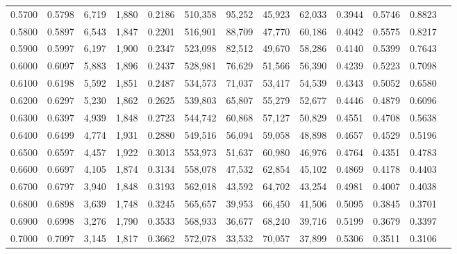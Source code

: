 \begin{tabular}{rrrrrrrrrrrrr}
0.5700 & 0.5798 &  6,719 & 1,880 &                                     0.2186 & 510,358 &  95,252 &  45,923 &  62,033 & 0.3944 & 0.5746 & 0.8823 \\
0.5800 & 0.5897 &  6,543 & 1,847 &                                     0.2201 & 516,901 &  88,709 &  47,770 &  60,186 & 0.4042 & 0.5575 & 0.8217 \\
0.5900 & 0.5997 &  6,197 & 1,900 &                                     0.2347 & 523,098 &  82,512 &  49,670 &  58,286 & 0.4140 & 0.5399 & 0.7643 \\
0.6000 & 0.6097 &  5,883 & 1,896 &                                     0.2437 & 528,981 &  76,629 &  51,566 &  56,390 & 0.4239 & 0.5223 & 0.7098 \\
0.6100 & 0.6198 &  5,592 & 1,851 &                                     0.2487 & 534,573 &  71,037 &  53,417 &  54,539 & 0.4343 & 0.5052 & 0.6580 \\
0.6200 & 0.6297 &  5,230 & 1,862 &                                     0.2625 & 539,803 &  65,807 &  55,279 &  52,677 & 0.4446 & 0.4879 & 0.6096 \\
0.6300 & 0.6397 &  4,939 & 1,848 &                                     0.2723 & 544,742 &  60,868 &  57,127 &  50,829 & 0.4551 & 0.4708 & 0.5638 \\
0.6400 & 0.6499 &  4,774 & 1,931 &                                     0.2880 & 549,516 &  56,094 &  59,058 &  48,898 & 0.4657 & 0.4529 & 0.5196 \\
0.6500 & 0.6597 &  4,457 & 1,922 &                                     0.3013 & 553,973 &  51,637 &  60,980 &  46,976 & 0.4764 & 0.4351 & 0.4783 \\
0.6600 & 0.6697 &  4,105 & 1,874 &                                     0.3134 & 558,078 &  47,532 &  62,854 &  45,102 & 0.4869 & 0.4178 & 0.4403 \\
0.6700 & 0.6797 &  3,940 & 1,848 &                                     0.3193 & 562,018 &  43,592 &  64,702 &  43,254 & 0.4981 & 0.4007 & 0.4038 \\
0.6800 & 0.6898 &  3,639 & 1,748 &                                     0.3245 & 565,657 &  39,953 &  66,450 &  41,506 & 0.5095 & 0.3845 & 0.3701 \\
0.6900 & 0.6998 &  3,276 & 1,790 &                                     0.3533 & 568,933 &  36,677 &  68,240 &  39,716 & 0.5199 & 0.3679 & 0.3397 \\
0.7000 & 0.7097 &  3,145 & 1,817 &                                     0.3662 & 572,078 &  33,532 &  70,057 &  37,899 & 0.5306 & 0.3511 & 0.3106 \\

\end{tabular}
